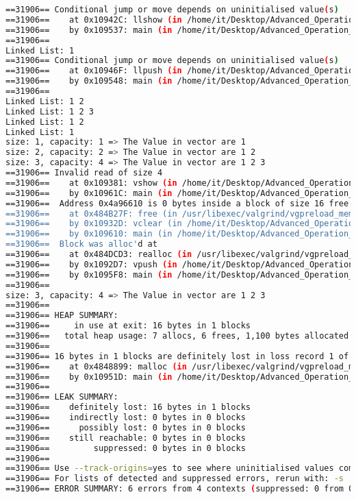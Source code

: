 \documentclass[10pt, answers]{exam}
\begin{document}
\begin{questions}
\begin{solution}
    \begin{lstlisting}[language=bash]
==31906== Conditional jump or move depends on uninitialised value(s)
==31906==    at 0x10942C: llshow (in /home/it/Desktop/Advanced_Operation_Systen/hw3/q8)
==31906==    by 0x109537: main (in /home/it/Desktop/Advanced_Operation_Systen/hw3/q8)
==31906==
Linked List: 1
==31906== Conditional jump or move depends on uninitialised value(s)
==31906==    at 0x10946F: llpush (in /home/it/Desktop/Advanced_Operation_Systen/hw3/q8)
==31906==    by 0x109548: main (in /home/it/Desktop/Advanced_Operation_Systen/hw3/q8)
==31906==
Linked List: 1 2
Linked List: 1 2 3
Linked List: 1 2
Linked List: 1
size: 1, capacity: 1 => The Value in vector are 1
size: 2, capacity: 2 => The Value in vector are 1 2
size: 3, capacity: 4 => The Value in vector are 1 2 3
==31906== Invalid read of size 4
==31906==    at 0x109381: vshow (in /home/it/Desktop/Advanced_Operation_Systen/hw3/q8)
==31906==    by 0x10961C: main (in /home/it/Desktop/Advanced_Operation_Systen/hw3/q8)
==31906==  Address 0x4a96610 is 0 bytes inside a block of size 16 free'd
==31906==    at 0x484B27F: free (in /usr/libexec/valgrind/vgpreload_memcheck-amd64-linux.so)
==31906==    by 0x10932D: vclear (in /home/it/Desktop/Advanced_Operation_Systen/hw3/q8)
==31906==    by 0x109610: main (in /home/it/Desktop/Advanced_Operation_Systen/hw3/q8)
==31906==  Block was alloc'd at
==31906==    at 0x484DCD3: realloc (in /usr/libexec/valgrind/vgpreload_memcheck-amd64-linux.so)
==31906==    by 0x1092D7: vpush (in /home/it/Desktop/Advanced_Operation_Systen/hw3/q8)
==31906==    by 0x1095F8: main (in /home/it/Desktop/Advanced_Operation_Systen/hw3/q8)
==31906==
size: 3, capacity: 4 => The Value in vector are 1 2 3
==31906==
==31906== HEAP SUMMARY:
==31906==     in use at exit: 16 bytes in 1 blocks
==31906==   total heap usage: 7 allocs, 6 frees, 1,100 bytes allocated
==31906==
==31906== 16 bytes in 1 blocks are definitely lost in loss record 1 of 1
==31906==    at 0x4848899: malloc (in /usr/libexec/valgrind/vgpreload_memcheck-amd64-linux.so)
==31906==    by 0x10951D: main (in /home/it/Desktop/Advanced_Operation_Systen/hw3/q8)
==31906==
==31906== LEAK SUMMARY:
==31906==    definitely lost: 16 bytes in 1 blocks
==31906==    indirectly lost: 0 bytes in 0 blocks
==31906==      possibly lost: 0 bytes in 0 blocks
==31906==    still reachable: 0 bytes in 0 blocks
==31906==         suppressed: 0 bytes in 0 blocks
==31906==
==31906== Use --track-origins=yes to see where uninitialised values come from
==31906== For lists of detected and suppressed errors, rerun with: -s
==31906== ERROR SUMMARY: 6 errors from 4 contexts (suppressed: 0 from 0)
    \end{lstlisting}
    

\end{solution}
\end{questions}
\end{document}
